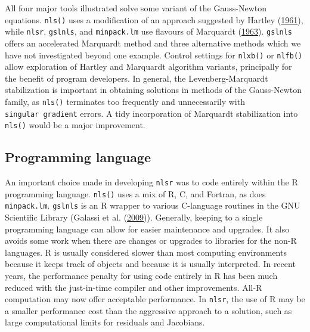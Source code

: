 \documentclass[
]{article}
\begin{document}
All four major tools illustrated solve some variant of the Gauss-Newton
equations. \texttt{nls()} uses a modification of an approach suggested
by Hartley (\protect\hyperlink{ref-Hartley1961}{1961}), while
\texttt{nlsr}, \texttt{gslnls}, and \texttt{minpack.lm} use flavours of
Marquardt (\protect\hyperlink{ref-Marquardt1963}{1963}). \texttt{gslnls}
offers an accelerated Marquardt method and three alternative methods
which we have not investigated beyond one example. Control settings for
\texttt{nlxb()} or \texttt{nlfb()} allow exploration of Hartley and
Marquardt algorithm variants, principally for the benefit of program
developers. In general, the Levenberg-Marquardt stabilization is
important in obtaining solutions in methods of the Gauss-Newton family,
as \texttt{nls()} terminates too frequently and unnecessarily with
\texttt{singular\ gradient} errors. A tidy incorporation of Marquardt
stabilization into \texttt{nls()} would be a major improvement.

\hypertarget{programming-language}{%
\subsection{Programming language}\label{programming-language}}

An important choice made in developing \texttt{nlsr} was to code
entirely within the R programming language. \texttt{nls()} uses a mix of
R, C, and Fortran, as does \texttt{minpack.lm}. \texttt{gslnls} is an R
wrapper to various C-language routines in the GNU Scientific Library
(Galassi et al. (\protect\hyperlink{ref-GSL-manual}{2009})). Generally,
keeping to a single programming language can allow for easier
maintenance and upgrades. It also avoids some work when there are
changes or upgrades to libraries for the non-R languages. R is usually
considered slower than most computing environments because it keeps
track of objects and because it is usually interpreted. In recent years,
the performance penalty for using code entirely in R has been much
reduced with the just-in-time compiler and other improvements. All-R
computation may now offer acceptable performance. In \texttt{nlsr}, the
use of R may be a smaller performance cost than the aggressive approach
to a solution, such as large computational limits for residuals and
Jacobians.
\end{document}
